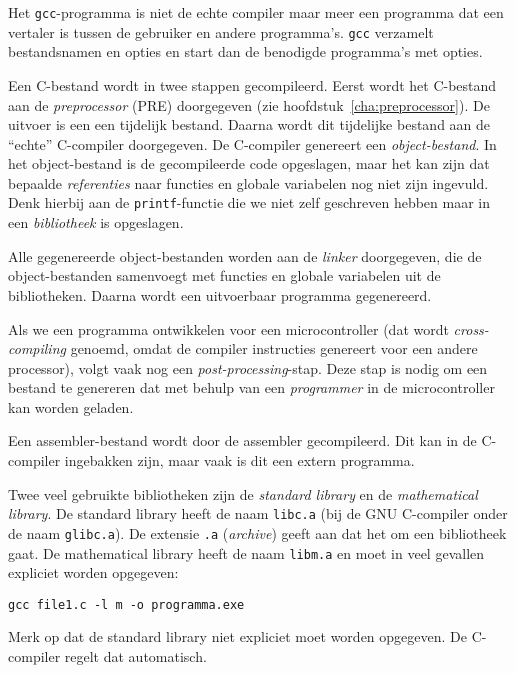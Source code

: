 Het \texttt{gcc}-programma is niet de echte compiler maar meer een programma dat een vertaler is tussen de gebruiker en andere programma's. \texttt{gcc} verzamelt bestandsnamen en opties en start dan de benodigde programma's met opties.

Een C-bestand wordt in twee stappen gecompileerd. Eerst wordt het C-bestand aan de \textsl{preprocessor} (PRE) doorgegeven (zie hoofdstuk~\ref{cha:preprocessor}). De uitvoer is een een tijdelijk bestand. Daarna wordt dit tijdelijke bestand aan de ``echte'' C-compiler doorgegeven. De C-compiler genereert een \textsl{object-bestand}. In het object-bestand is de gecompileerde code opgeslagen, maar het kan zijn dat bepaalde \textsl{referenties} naar functies en globale variabelen nog niet zijn ingevuld. Denk hierbij aan de \texttt{printf}-functie die we niet zelf geschreven hebben maar in een \textsl{bibliotheek} is opgeslagen.

Alle gegenereerde object-bestanden worden aan de \textsl{linker} doorgegeven, die de object-bestanden samenvoegt met functies en globale variabelen uit de bibliotheken. Daarna wordt een uitvoerbaar programma gegenereerd.

Als we een programma ontwikkelen voor een microcontroller (dat wordt \textsl{cross-compiling} genoemd, omdat de compiler instructies genereert voor een andere processor), volgt vaak nog een \textsl{post-processing}-stap. Deze stap is nodig om een bestand te genereren dat met behulp van een \textsl{programmer} in de microcontroller kan worden geladen.

Een assembler-bestand wordt door de assembler gecompileerd. Dit kan in de C-compiler ingebakken zijn, maar vaak is dit een extern programma.

Twee veel gebruikte bibliotheken zijn de \textsl{standard library} en de \textsl{mathematical library}. De standard library heeft de naam \texttt{libc.a} (bij de GNU C-compiler onder de naam \texttt{glibc.a}). De extensie \texttt{.a} (\textsl{archive}) geeft aan dat het om een bibliotheek gaat. De mathematical library heeft de naam \texttt{libm.a} en moet in veel gevallen expliciet worden opgegeven:

\hspace*{1em}\texttt{gcc file1.c -l m -o programma.exe}

Merk op dat de standard library niet expliciet moet worden opgegeven. De C-compiler regelt dat automatisch.

